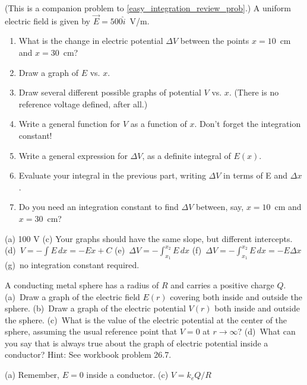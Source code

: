 \begin{Exercise}
(This is a companion problem to \ref{easy_integration_review_prob}.) 
A uniform electric field is given by $\vec{E} = 500\hat{i}$~V/m. 
\begin{enumerate}[label=(\alph*), nosep, topsep=-2ex, after={\vspace{2ex}}]
\item What is the change in electric potential $\Delta V$ between the points $x=10$~cm and $x=30$~cm? 
\item Draw a graph of $E$ vs. $x$.
\item Draw several different possible graphs of potential $V$ vs. $x$. (There is no reference voltage defined, after all.)
\item Write a general function for $V$ as a function of $x$.  Don't forget the integration constant! 
\item Write a general expression for $\Delta V$, as a definite integral of $E(x)$.
\item Evaluate your integral in the previous part, writing $\Delta V$ in terms of E and $\Delta x$.
\item Do you need an integration constant to find $\Delta V$ between, say, $x=10$~cm and $x=30$~cm?  
\end{enumerate}
\end{Exercise}
\begin{Answer}
(a) 100 V (c) Your graphs should have the same slope, but different intercepts.
(d)~$V=-\int{E\,dx}=-Ex+C$
(e)~$\Delta V=  -\int_{x_1}^{x_2}{ E\, dx}$
(f)~$ \Delta V=   -\int_{x_1}^{x_2}{ E\, dx} = -E\Delta x$
(g)~no integration constant required.
\end{Answer}

\begin{Exercise}
A conducting metal sphere has a radius of $R$ and carries a positive charge $Q$.  
(a)~Draw a graph of the electric field $E(r)$ covering both inside and outside the sphere.  
(b)~Draw a graph of the electric potential $V(r)$ both inside and outside the sphere.  
(c)~What is the value of the electric potential at the center of the sphere, assuming the usual reference point that $V=0$ at $r \to \infty$? 
(d)~What can you say that is always true about the graph of electric potential inside a conductor?  Hint: See workbook problem 26.7.
\end{Exercise}
\begin{Answer}
(a) Remember, $E=0$ inside a conductor.  (c) $V=k_e Q/R$
\end{Answer}

